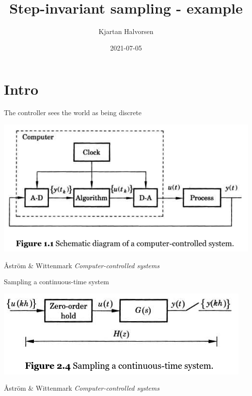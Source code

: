 \documentclass[presentation,aspectratio=169]{beamer}
\author{Kjartan Halvorsen}
\date{2021-07-05}
\title{Step-invariant sampling - example}
\begin{document}
\maketitle

\section{Intro}
\label{sec:org136363a}
\begin{frame}[label={sec:org38903f7}]{The controller sees the world as being discrete}
\begin{center}
\includegraphics[width=0.7\linewidth]{../../figures/fig1-1-schematic.png}
\end{center}
{\footnotesize Åström \& Wittenmark \textit{Computer-controlled systems}}
\end{frame}
\begin{frame}[label={sec:orgca009df}]{Sampling a continuous-time system}
\begin{center}
\includegraphics[width=0.6\linewidth]{../../figures/fig2-4.png}
\end{center}
{\footnotesize Åström \& Wittenmark \textit{Computer-controlled systems}}
\end{frame}
\end{document}
